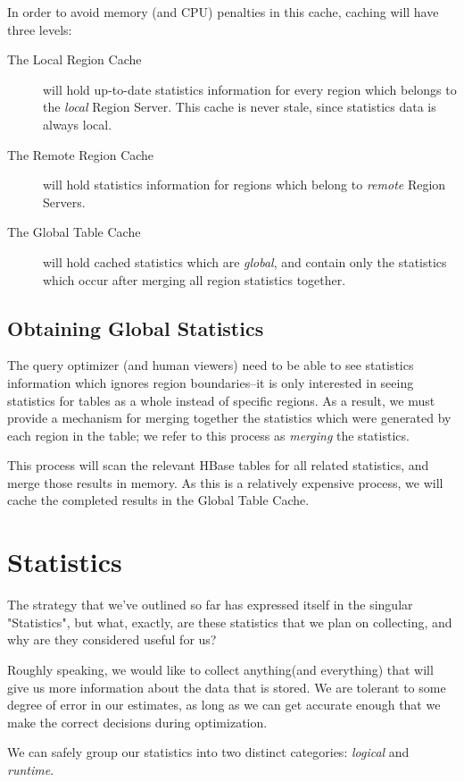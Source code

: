 In order to avoid memory (and CPU) penalties in this cache, caching will have three levels:

\begin{description}
\item[The Local Region Cache] will hold up-to-date statistics information for every region which belongs to the \emph{local} Region Server. This cache is never stale, since statistics data is always local.
\item[The Remote Region Cache] will hold statistics information for regions which belong to \emph{remote} Region Servers.
\item[The Global Table Cache] will hold cached statistics which are \emph{global}, and contain only the statistics which occur after merging all region statistics together.
\end{description}

\subsection{Obtaining Global Statistics}
The query optimizer (and human viewers) need to be able to see statistics information which ignores region boundaries--it is only interested in seeing statistics for tables as a whole instead of specific regions. As a result, we must provide a mechanism for merging together the statistics which were generated by each region in the table; we refer to this process as \emph{merging} the statistics.

This process will scan the relevant HBase tables for all related statistics, and merge those results in memory. As this is a relatively expensive process, we will cache the completed results in the Global Table Cache. 

\section{Statistics}
\label{sec:Statistics}
The strategy that we've outlined so far has expressed itself in the singular "Statistics", but what, exactly, are these statistics that we plan on collecting, and why are they considered useful for us?

Roughly speaking, we would like to collect anything(and everything) that will give us more information about the data that is stored. We are tolerant to some degree of error in our estimates, as long as we can get accurate enough that we make the correct decisions during optimization. 

We can safely group our statistics into two distinct categories: \emph{logical} and \emph{runtime}.  

